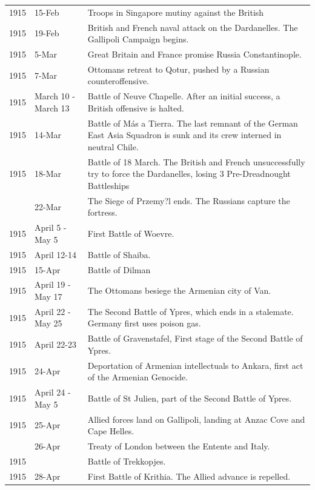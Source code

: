 \documentclass[
  openany]{book}
\begin{document}
\begin{longtable}[t]{rl>{\raggedright\arraybackslash}p{22em}}
\rowcolor{gray!6}  1915 & 15-Feb & Troops in Singapore mutiny against the British\\
1915 & 19-Feb & British and French naval attack on the Dardanelles. The Gallipoli Campaign begins.\\
\addlinespace
\rowcolor{gray!6}  1915 & 5-Mar & Great Britain and France promise Russia Constantinople.\\
1915 & 7-Mar & Ottomans retreat to Qotur, pushed by a Russian counteroffensive.\\
\rowcolor{gray!6}  1915 & March 10 - March 13 & Battle of Neuve Chapelle. After an initial success, a British offensive is halted.\\
1915 & 14-Mar & Battle of Más a Tierra. The last remnant of the German East Asia Squadron is sunk and its crew interned in neutral Chile.\\
\rowcolor{gray!6}  1915 & 18-Mar & Battle of 18 March. The British and French unsuccessfully try to force the Dardanelles, losing 3 Pre-Dreadnought Battleships\\
\addlinespace
1915 & 22-Mar & The Siege of Przemy?l ends. The Russians capture the fortress.\\
\rowcolor{gray!6}  1915 & April 5 - May 5 & First Battle of Woevre.\\
1915 & April 12-14 & Battle of Shaiba.\\
\rowcolor{gray!6}  1915 & 15-Apr & Battle of Dilman\\
1915 & April 19 - May 17 & The Ottomans besiege the Armenian city of Van.\\
\addlinespace
\rowcolor{gray!6}  1915 & April 22 - May 25 & The Second Battle of Ypres, which ends in a stalemate. Germany first uses poison gas.\\
1915 & April 22-23 & Battle of Gravenstafel, First stage of the Second Battle of Ypres.\\
\rowcolor{gray!6}  1915 & 24-Apr & Deportation of Armenian intellectuals to Ankara, first act of the Armenian Genocide.\\
1915 & April 24 - May 5 & Battle of St Julien, part of the Second Battle of Ypres.\\
\rowcolor{gray!6}  1915 & 25-Apr & Allied forces land on Gallipoli, landing at Anzac Cove and Cape Helles.\\
\addlinespace
1915 & 26-Apr & Treaty of London between the Entente and Italy.\\
\rowcolor{gray!6}  1915 &  & Battle of Trekkopjes.\\
1915 & 28-Apr & First Battle of Krithia. The Allied advance is repelled.\\

\end{longtable}
\end{document}
